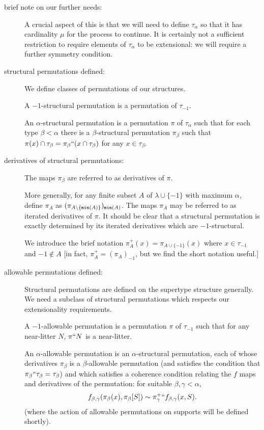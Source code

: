 \documentclass[112pt]{article}
\begin{document}
\begin{description}



\item[brief note on our further needs:]  A crucial aspect of this is that we will need to define $\tau_\alpha$ so that it has cardinality $\mu$ for the process to continue.  It is certainly not a sufficient restriction to require elements of $\tau_\alpha$ to be extensional:  we will require a further symmetry condition.

\item[structural permutations defined:]  We define classes of permutations of our structures.

A $-1$-structural permutation is a permutation of $\tau_{-1}$.

An $\alpha$-structural permutation is a permutation $\pi$ of $\tau_\alpha$ such that for each type $\beta<\alpha$ there is a $\beta$-structural permutation
$\pi_\beta$ such that $\pi(x) \cap \tau_\beta = \pi_\beta``(x \cap \tau_\beta)$ for any $x \in \tau_\beta$.

\item[derivatives of structural permutations:]  The maps $\pi_\beta$ are referred to as derivatives of $\pi$.

  More generally, for any finite subset $A$ of $\lambda \cup \{-1\}$ with maximum $\alpha$,
define $\pi_A$ as $(\pi_{A \setminus \{{\tt min}(A)\}})_{{\tt min}(A)}$.  The maps $\pi_A$ may be referred to as iterated derivatives of $\pi$.  It should be clear that a structural permutation is exactly determined by its iterated derivatives which are $-1$-structural.

We introduce the brief notation $\pi^+_A(x) = \pi_{A \cup \{-1\}}(x)$ where $x \in \tau_{-1}$ and $-1 \not\in A$ [in fact, $\pi^+_A = (\pi_A)_{-1}$, but we find the short notation useful.]

\item[allowable permutations defined:]  Structural permutations are defined on the supertype structure generally.  We need a subclass of structural permutations which respects our extensionality requirements.

A $-1$-allowable permutation is a permutation $\pi$ of $\tau_{-1}$ such that for any near-litter $N$, $\pi``N$ is a near-litter.

An $\alpha$-allowable permutation is an $\alpha$-structural permutation, each of whose derivatives $\pi_\beta$ is a $\beta$-allowable permutation (and satisfies the condition that $\pi_\beta``\tau_\beta = \tau_\beta$) and which satisfies a coherence condition relating the $f$ maps and derivatives of the permutation:  for suitable $\beta,\gamma<\alpha$, $$f_{\beta,\gamma}(\pi_\beta(x),\pi_{\beta}[S]) \sim \pi_\gamma^+``f_{\beta,\gamma}(x,S).$$  (where the action of allowable
 permutations on supports will be defined shortly).


\end{description}
\end{document}
